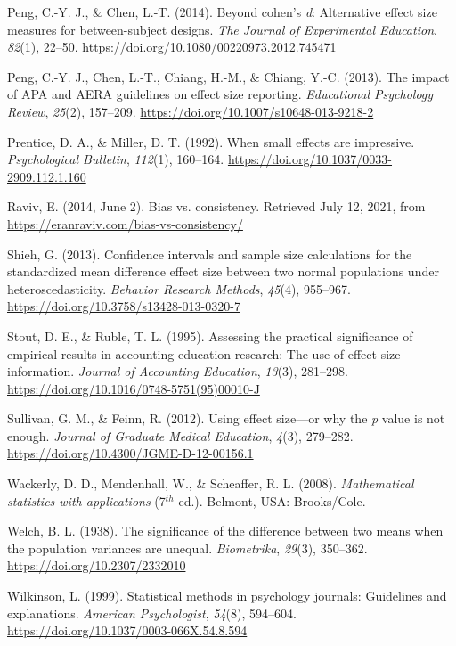 \documentclass[
  english,
  man,floatsintext]{apa6}
\newlength{\cslhangindent}
\newlength{\cslentryspacingunit} %
\newenvironment{CSLReferences}[2] %
 {%
  \setlength{\parindent}{0pt}
  \ifodd #1
  \let\oldpar\par
  \def\par{\hangindent=\cslhangindent\oldpar}
  \fi
  \setlength{\parskip}{#2\cslentryspacingunit}
 }%
 {}
\begin{document}
\begin{CSLReferences}{1}{0}
\leavevmode{}%
Peng, C.-Y. J., \& Chen, L.-T. (2014). Beyond cohen's \emph{d}: Alternative effect size measures for between-subject designs. \emph{The Journal of Experimental Education}, \emph{82}(1), 22--50. \url{https://doi.org/10.1080/00220973.2012.745471}

\leavevmode{}%
Peng, C.-Y. J., Chen, L.-T., Chiang, H.-M., \& Chiang, Y.-C. (2013). The impact of {APA} and {AERA} guidelines on effect size reporting. \emph{Educational Psychology Review}, \emph{25}(2), 157--209. \url{https://doi.org/10.1007/s10648-013-9218-2}

\leavevmode{}%
Prentice, D. A., \& Miller, D. T. (1992). When small effects are impressive. \emph{Psychological Bulletin}, \emph{112}(1), 160--164. \url{https://doi.org/10.1037/0033-2909.112.1.160}

\leavevmode{}%
Raviv, E. (2014, June 2). Bias vs. consistency. Retrieved July 12, 2021, from \url{https://eranraviv.com/bias-vs-consistency/}

\leavevmode{}%
Shieh, G. (2013). Confidence intervals and sample size calculations for the standardized mean difference effect size between two normal populations under heteroscedasticity. \emph{Behavior Research Methods}, \emph{45}(4), 955--967. \url{https://doi.org/10.3758/s13428-013-0320-7}

\leavevmode{}%
Stout, D. E., \& Ruble, T. L. (1995). Assessing the practical significance of empirical results in accounting education research: The use of effect size information. \emph{Journal of Accounting Education}, \emph{13}(3), 281--298. \url{https://doi.org/10.1016/0748-5751(95)00010-J}

\leavevmode{}%
Sullivan, G. M., \& Feinn, R. (2012). Using effect size---or why the \emph{p} value is not enough. \emph{Journal of Graduate Medical Education}, \emph{4}(3), 279--282. \url{https://doi.org/10.4300/JGME-D-12-00156.1}

\leavevmode{}%
Wackerly, D. D., Mendenhall, W., \& Scheaffer, R. L. (2008). \emph{Mathematical statistics with applications} (7\(^{th}\) ed.). Belmont, {USA}: Brooks/Cole.

\leavevmode{}%
Welch, B. L. (1938). The significance of the difference between two means when the population variances are unequal. \emph{Biometrika}, \emph{29}(3), 350--362. \url{https://doi.org/10.2307/2332010}

\leavevmode{}%
Wilkinson, L. (1999). Statistical methods in psychology journals: Guidelines and explanations. \emph{American Psychologist}, \emph{54}(8), 594--604. \url{https://doi.org/10.1037/0003-066X.54.8.594}

\end{CSLReferences}
\end{document}
